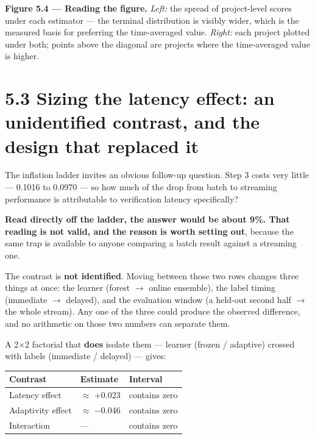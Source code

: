 \textbf{Figure 5.4 --- Reading the figure.} \emph{Left:} the spread of
project-level scores under each estimator --- the terminal distribution
is visibly wider, which is the measured basis for preferring the
time-averaged value. \emph{Right:} each project plotted under both;
points above the diagonal are projects where the time-averaged value is
higher.

\section{5.3 Sizing the latency effect: an unidentified contrast, and
the design that replaced
it}\label{sizing-the-latency-effect-an-unidentified-contrast-and-the-design-that-replaced-it}

The inflation ladder invites an obvious follow-up question. Step 3 costs
very little --- 0.1016 to 0.0970 --- so how much of the drop from batch
to streaming performance is attributable to verification latency
specifically?

\textbf{Read directly off the ladder, the answer would be about 9\%.
That reading is not valid, and the reason is worth setting out}, because
the same trap is available to anyone comparing a batch result against a
streaming one.

The contrast is \textbf{not identified}. Moving between those two rows
changes three things at once: the learner (forest \ensuremath{\rightarrow} online ensemble),
the label timing (immediate \ensuremath{\rightarrow} delayed), and the evaluation window (a
held-out second half \ensuremath{\rightarrow} the whole stream). Any one of the three could
produce the observed difference, and no arithmetic on those two numbers
can separate them.

A 2\ensuremath{\times}2 factorial that \textbf{does} isolate them --- learner (frozen /
adaptive) crossed with labels (immediate / delayed) --- gives:

\begin{longtable}[]{@{}lll@{}}
\toprule\noalign{}
Contrast & Estimate & Interval \\
\midrule\noalign{}
\endhead
\bottomrule\noalign{}
\endlastfoot
Latency effect & \ensuremath{\approx} +0.023 & contains zero \\
Adaptivity effect & \ensuremath{\approx} \ensuremath{-}0.046 & contains zero \\
Interaction & --- & contains zero \\
\end{longtable}

